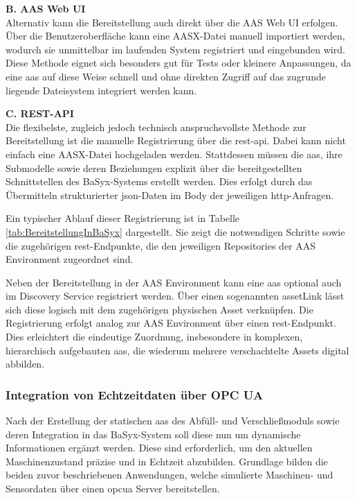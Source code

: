 \clearpage
\noindent\textbf{B. AAS Web UI}\\[0.5em]
Alternativ kann die Bereitstellung auch direkt über die AAS Web UI erfolgen.
Über die Benutzeroberfläche kann eine AASX-Datei manuell importiert werden, wodurch sie unmittelbar im laufenden System registriert und eingebunden wird.
Diese Methode eignet sich besonders gut für Tests oder kleinere Anpassungen, da eine \acs{aas} auf diese Weise schnell und ohne direkten Zugriff auf das zugrunde liegende Dateisystem integriert werden kann.

\vspace{0.5em}
\noindent\textbf{C. REST-API}\\[0.5em]
Die flexibelste, zugleich jedoch technisch anspruchsvollste Methode zur Bereitstellung ist die manuelle Registrierung über die \acs{rest}-\acs{api}. 
Dabei kann nicht einfach eine AASX-Datei hochgeladen werden. 
Stattdessen müssen die \acs{aas}, ihre Submodelle sowie deren Beziehungen explizit über die bereitgestellten Schnittstellen des BaSyx-Systems erstellt werden. 
Dies erfolgt durch das Übermitteln strukturierter \acs{json}-Daten im Body der jeweiligen \acs{http}-Anfragen.

Ein typischer Ablauf dieser Registrierung ist in Tabelle \ref{tab:BereitstellungInBaSyx} dargestellt. 
Sie zeigt die notwendigen Schritte sowie die zugehörigen \acs{rest}-Endpunkte, die den jeweiligen Repositories der AAS Environment zugeordnet sind.

\vspace{0.25em}


Neben der Bereitstellung in der AAS Environment kann eine \acs{aas} optional auch im Discovery Service registriert werden.
Über einen sogenannten assetLink lässt sich diese logisch mit dem zugehörigen physischen Asset verknüpfen.
Die Registrierung erfolgt analog zur AAS Environment über einen \acs{rest}-Endpunkt.
Dies erleichtert die eindeutige Zuordnung, insbesondere in komplexen, hierarchisch aufgebauten \acs{aas}, die wiederum mehrere verschachtelte Assets digital abbilden.

\newpage
\subsubsection{Integration von Echtzeitdaten über OPC UA}

Nach der Erstellung der statischen \acs{aas} des Abfüll- und Verschließmoduls sowie deren Integration in das BaSyx-System soll diese nun um dynamische Informationen ergänzt werden.
Diese sind erforderlich, um den aktuellen Maschinenzustand präzise und in Echtzeit abzubilden.
Grundlage bilden die beiden zuvor beschriebenen Anwendungen, welche simulierte Maschinen- und Sensordaten über einen \acs{opcua} Server bereitstellen.

